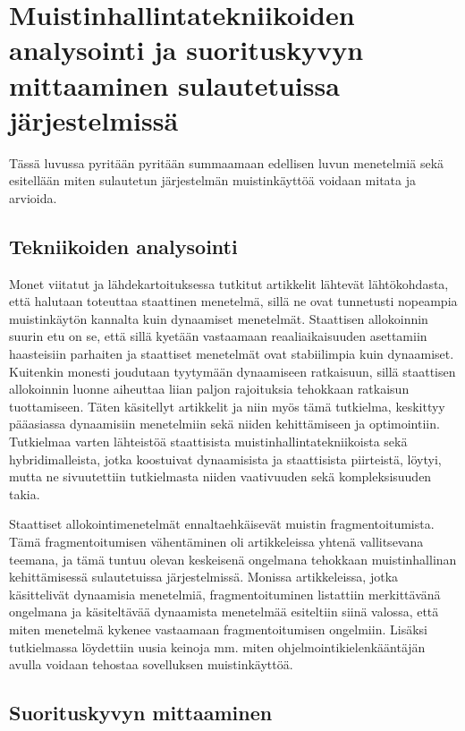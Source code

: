 \chapter{Muistinhallintatekniikoiden analysointi ja suorituskyvyn mittaaminen sulautetuissa järjestelmissä} \label{Kuudes luku}

Tässä luvussa pyritään pyritään summaamaan edellisen luvun menetelmiä sekä esitellään miten sulautetun järjestelmän muistinkäyttöä voidaan mitata ja arvioida.

\section{Tekniikoiden analysointi}

Monet viitatut ja lähdekartoituksessa tutkitut artikkelit lähtevät lähtökohdasta, että halutaan toteuttaa staattinen menetelmä, sillä ne ovat tunnetusti nopeampia muistinkäytön kannalta kuin dynaamiset menetelmät. Staattisen allokoinnin suurin etu on se, että sillä kyetään vastaamaan reaaliaikaisuuden asettamiin haasteisiin parhaiten ja staattiset menetelmät ovat stabiilimpia kuin dynaamiset\cite{daroemmfera@2006}. Kuitenkin monesti joudutaan tyytymään dynaamiseen ratkaisuun, sillä staattisen allokoinnin luonne aiheuttaa liian paljon rajoituksia tehokkaan ratkaisun tuottamiseen. Täten käsitellyt artikkelit ja niin myös tämä tutkielma, keskittyy pääasiassa dynaamisiin menetelmiin sekä niiden kehittämiseen ja optimointiin. Tutkielmaa varten lähteistöä staattisista muistinhallintatekniikoista sekä hybridimalleista, jotka koostuivat dynaamisista ja staattisista piirteistä, löytyi, mutta ne sivuutettiin tutkielmasta niiden vaativuuden sekä kompleksisuuden takia.

Staattiset allokointimenetelmät ennaltaehkäisevät muistin fragmentoitumista\cite{daroemmfera@2006}. Tämä fragmentoitumisen vähentäminen oli artikkeleissa yhtenä vallitsevana teemana, ja tämä tuntuu olevan keskeisenä ongelmana tehokkaan muistinhallinan kehittämisessä sulautetuissa järjestelmissä. Monissa artikkeleissa, jotka käsittelivät dynaamisia menetelmiä, fragmentoituminen listattiin merkittävänä ongelmana ja käsiteltävää dynaamista menetelmää esiteltiin siinä valossa, että miten menetelmä kykenee vastaamaan fragmentoitumisen ongelmiin. Lisäksi tutkielmassa löydettiin uusia keinoja mm. miten ohjelmointikielenkääntäjän avulla voidaan tehostaa sovelluksen muistinkäyttöä.

\section{Suorituskyvyn mittaaminen}

